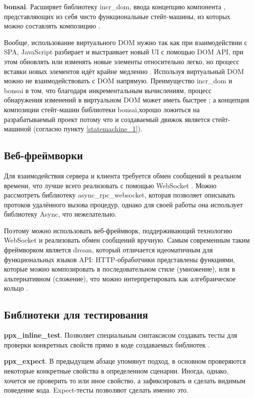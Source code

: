 \textbf{bonsai}. Расширяет библиотеку incr\_dom, ввода концепцию компонента \cite{bonsai-history},
представляющих из себя чисто функциональные стейт-машины, из которых можно составлять композицию \cite{janestreet-bonsai}.

Вообще, использование виртуального DOM нужно так как при взаимодействии с SPA, JavaScript разбирает и выстраивает новый UI
с помощью DOM API, при этом обновлять или изменять новые элементы относительно легко, но процесс вставки новых элементов
идёт крайне медленно \cite[с. 72]{react-book}. Используя виртуальный DOM можно не взаимодействовать с DOM напрямую.
Преимущество incr\_dom и bonsai в том, что благодаря инкрементальным вычислениям, процесс обнаружения изменений в
виртуальном DOM может иметь быстрее \cite{minsky-incrdom};
а концепция композиции стейт-машин библиотеки bonsai,хорошо ложиться на
разрабатываемый проект потому что и создаваемый движок является стейт-машиной (согласно пункту \ref{statemachine_1}).

\subsection{Веб-фреймворки}

Для взаимодействия сервера и клиента требуется обмен сообщений в реальном времени, что лучше всего реализовать
с помощью WebSocket \cite{mdn-websoket}. Можно рассмотреть библиотеку async\_rpc\_websocket,
которая позволяет описывать протоков удалённого вызова процедур, однако
для своей работы она использует библиотеку Async, что нежелательно.

Поэтому можно использовать веб-фреймворк, поддерживающий технологию WebSocket и реализовать обмен сообщений вручную.
Самым современным таким фреймворком является dream, который отличается идеоматичным для функциональных языков API:
HTTP-обработчики представлены функциями, которые можно композировать в последовательном стиле (умножение),
или в альтернативном (сложение), что можно интерпретировать как алгебраическое кольцо \cite{dream}.

\subsection{Библиотеки для тестирования}

\textbf{ppx\_inline\_test}. Позволяет специальным синтаксисом создавать тесты
для проверки конкретных свойств
прямо в коде создаваемых библиотек \cite{rwo-testing}.

\textbf{ppx\_expect}. В предыдущем абзаце упомянут подход, в основном проверяются некоторые конкретные
свойства в определенном сценарии. Иногда, однако, хочется не проверить то или иное свойство, а зафиксировать
и сделать видимым поведение кода. Expect-тесты позволяют сделать именно это. \cite{rwo-testing}

